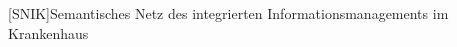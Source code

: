 \begin{acronym}[SPARQL]
[SNIK]{Semantisches Netz des integrierten Informationsmanagements im Krankenhaus}
\end{acronym}
